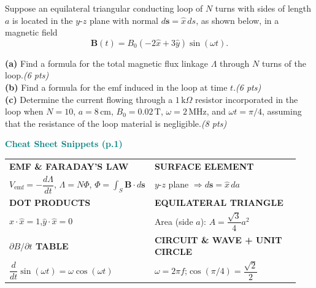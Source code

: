 \documentclass[11pt,letterpaper]{article}
\begin{document}
\begin{qbox}
Suppose an equilateral triangular conducting loop of $N$ turns with sides of length $a$ is located in the $y$-$z$ plane with normal $d\mathbf{s}=\hat{x}\,ds$, as shown below, in a magnetic field
\[
\mathbf{B}(t)=B_0(-2\hat{x}+3\hat{y})\sin(\omega t).
\]
\begin{center}
\end{center}
\textbf{(a)} Find a formula for the total magnetic flux linkage $\Lambda$ through $N$ turns of the loop.\hfill\textit{(6 pts)}\\[3pt]
\textbf{(b)} Find a formula for the emf induced in the loop at time $t$.\hfill\textit{(6 pts)}\\[3pt]
\textbf{(c)} Determine the current flowing through a $1\,\text{k}\Omega$ resistor incorporated in the loop when $N=10$, $a=8\,\text{cm}$, $B_0=0.02\,\text{T}$, $\omega=2\,\text{MHz}$, and $\omega t=\pi/4$, assuming that the resistance of the loop material is negligible.\hfill\textit{(8 pts)}
\end{qbox}

\begin{cssnip}
\textbf{\small\textcolor{teal}{Cheat Sheet Snippets (p.1)}}\\[3pt]
\begin{tabular}{@{}p{0.47\linewidth}p{0.47\linewidth}@{}}
\textbf{EMF \& FARADAY'S LAW} & \textbf{SURFACE ELEMENT}\\
$V_\text{emf}=-\dfrac{d\Lambda}{dt}$,\; $\Lambda=N\Phi$,\; $\Phi=\displaystyle\int_S\mathbf{B}\cdot d\mathbf{s}$ &
$y$-$z$ plane $\Rightarrow d\mathbf{s}=\hat{x}\,da$\\[5pt]
\textbf{DOT PRODUCTS} & \textbf{EQUILATERAL TRIANGLE}\\
$\hat{x}\cdot\hat{x}=1$,\quad $\hat{y}\cdot\hat{x}=0$ & Area (side $a$): $A=\dfrac{\sqrt{3}}{4}a^2$\\[5pt]
\textbf{$\partial B/\partial t$ TABLE} & \textbf{CIRCUIT \& WAVE + UNIT CIRCLE}\\
$\dfrac{d}{dt}\sin(\omega t)=\omega\cos(\omega t)$ & $\omega=2\pi f$;\quad $\cos(\pi/4)=\dfrac{\sqrt{2}}{2}$\\
\end{tabular}
\end{cssnip}
\end{document}
